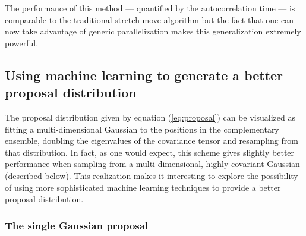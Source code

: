 \documentclass[12pt,preprint]{aastex}
\newcommand{\eq}[1]{equation (\ref{eq:#1})}
\begin{document}
The performance of this method --- quantified by the autocorrelation time --- is
comparable to the traditional stretch move algorithm but the fact that one can now
take advantage of generic parallelization makes this generalization extremely
powerful.

\subsection{Using machine learning to generate a better proposal distribution}

The proposal distribution given by \eq{proposal} can be visualized as fitting a
multi-dimensional Gaussian to the positions in the complementary ensemble,
doubling the eigenvalues of the covariance tensor and resampling from that
distribution. In fact, as one would expect, this scheme gives slightly better
performance when sampling from a multi-dimensional, highly covariant Gaussian
(described below). This realization makes it interesting to explore the possibility
of using more sophisticated machine learning techniques to provide a better proposal
distribution.

\subsubsection{The single Gaussian proposal}
\end{document}
